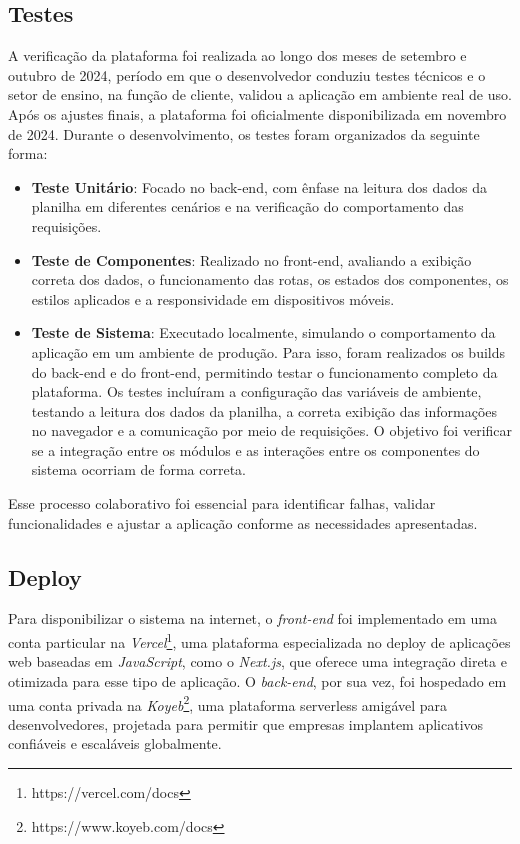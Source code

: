 \subsection{Testes}

A verificação da plataforma foi realizada ao longo dos meses de setembro e outubro de 2024, período em que o desenvolvedor conduziu testes técnicos e o setor de ensino, na função de cliente, validou a aplicação em ambiente real de uso. Após os ajustes finais, a plataforma foi oficialmente disponibilizada em novembro de 2024. Durante o desenvolvimento, os testes foram organizados da seguinte forma:

\begin{itemize}
    \item \textbf{Teste Unitário}: Focado no back-end, com ênfase na leitura dos dados da planilha em diferentes cenários e na verificação do comportamento das requisições.
    \item \textbf{Teste de Componentes}: Realizado no front-end, avaliando a exibição correta dos dados, o funcionamento das rotas, os estados dos componentes, os estilos aplicados e a responsividade em dispositivos móveis.
    \item \textbf{Teste de Sistema}: Executado localmente, simulando o comportamento da aplicação em um ambiente de produção. Para isso, foram realizados os builds do back-end e do front-end, permitindo testar o funcionamento completo da plataforma. Os testes incluíram a configuração das variáveis de ambiente, testando a leitura dos dados da planilha, a correta exibição das informações no navegador e a comunicação por meio de requisições. O objetivo foi verificar se a integração entre os módulos e as interações entre os componentes do sistema ocorriam de forma correta.
\end{itemize}

Esse processo colaborativo foi essencial para identificar falhas, validar funcionalidades e ajustar a aplicação conforme as necessidades apresentadas.

\subsection{Deploy}

Para disponibilizar o sistema na internet, o \textit{front-end} foi implementado em uma conta particular na \textit{Vercel}\footnote{https://vercel.com/docs}, uma plataforma especializada no deploy de aplicações web baseadas em \textit{JavaScript}, como o \textit{Next.js}, que oferece uma integração direta e otimizada para esse tipo de aplicação. O \textit{back-end}, por sua vez, foi hospedado em uma conta privada na \textit{Koyeb}\footnote{https://www.koyeb.com/docs}, uma plataforma serverless amigável para desenvolvedores, projetada para permitir que empresas implantem aplicativos confiáveis e escaláveis globalmente.

